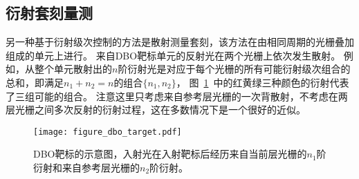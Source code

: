 \subsection{衍射套刻量测~\label{衍射套刻量测}}

另一种基于衍射级次控制的方法是散射测量套刻，该方法在由相同周期的光栅叠加组成的单元上进行。
来自DBO靶标单元的反射光在两个光栅上依次发生散射。
例如，从整个单元散射出的$n$阶衍射光是对应于每个光栅的所有可能衍射级次组合的总和，即满足$n_1+n_2=n$的组合$\{n_1, n_2\}$，
图~\ref{fig:dbo-target}~中的红黄绿三种颜色的衍射代表了三组可能的组合。
注意这里只考虑来自参考层光栅的一次背散射，不考虑在两层光栅之间多次反射的衍射过程，这在多数情况下是一个很好的近似。

\begin{figure}[!b]
\centering
\texttt{[image: figure\_dbo\_target.pdf]}
\caption{DBO靶标的示意图，入射光在入射靶标后经历来自当前层光栅的$n_1$阶衍射和来自参考层光栅的$n_2$阶衍射。}
\label{fig:dbo-target}
\end{figure}

